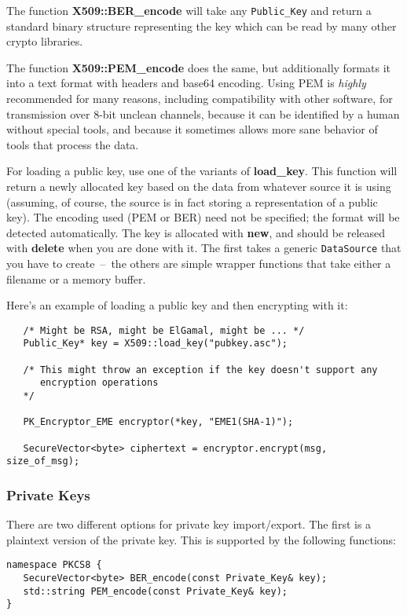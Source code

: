 \documentclass{article}
\newcommand{\function}[1]{\textbf{#1}}
\newcommand{\type}[1]{\texttt{#1}}
\begin{document}
The function \function{X509::BER\_encode} will take any
\type{Public\_Key} and return a standard binary structure representing
the key which can be read by many other crypto libraries.

The function \function{X509::PEM\_encode} does the same, but
additionally formats it into a text format with headers and base64
encoding. Using PEM is \emph{highly} recommended for many reasons,
including compatibility with other software, for transmission over
8-bit unclean channels, because it can be identified by a human
without special tools, and because it sometimes allows more sane
behavior of tools that process the data.

For loading a public key, use one of the variants of
\function{load\_key}. This function will return a newly allocated key
based on the data from whatever source it is using (assuming, of
course, the source is in fact storing a representation of a public
key). The encoding used (PEM or BER) need not be specified; the format
will be detected automatically. The key is allocated with
\function{new}, and should be released with \function{delete} when you
are done with it. The first takes a generic \type{DataSource} that you
have to create~--~the others are simple wrapper functions that take
either a filename or a memory buffer.

Here's an example of loading a public key and then encrypting with it:

\begin{verbatim}
   /* Might be RSA, might be ElGamal, might be ... */
   Public_Key* key = X509::load_key("pubkey.asc");

   /* This might throw an exception if the key doesn't support any
      encryption operations
   */

   PK_Encryptor_EME encryptor(*key, "EME1(SHA-1)");

   SecureVector<byte> ciphertext = encryptor.encrypt(msg, size_of_msg);
\end{verbatim}

\subsubsection{Private Keys}

There are two different options for private key import/export. The first is a
plaintext version of the private key. This is supported by the following
functions:

\begin{verbatim}
namespace PKCS8 {
   SecureVector<byte> BER_encode(const Private_Key& key);
   std::string PEM_encode(const Private_Key& key);
}
\end{verbatim}
\end{document}

